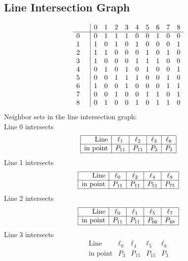 \documentclass{article}
\begin{document}
{\subsection*{Line Intersection Graph}
{\arraycolsep=1pt
$$
\begin{array}{rr|*{9}r}
 &  & 0 & 1 & 2 & 3 & 4 & 5 & 6 & 7 & 8\\
\hline
0 &  & 0 & 1 & 1 & 1 & 0 & 0 & 1 & 0 & 0\\
1 &  & 1 & 0 & 1 & 0 & 1 & 0 & 0 & 0 & 1\\
2 &  & 1 & 1 & 0 & 0 & 0 & 1 & 0 & 1 & 0\\
3 &  & 1 & 0 & 0 & 0 & 1 & 1 & 1 & 0 & 0\\
4 &  & 0 & 1 & 0 & 1 & 0 & 1 & 0 & 0 & 1\\
5 &  & 0 & 0 & 1 & 1 & 1 & 0 & 0 & 1 & 0\\
6 &  & 1 & 0 & 0 & 1 & 0 & 0 & 0 & 1 & 1\\
7 &  & 0 & 0 & 1 & 0 & 0 & 1 & 1 & 0 & 1\\
8 &  & 0 & 1 & 0 & 0 & 1 & 0 & 1 & 1 & 0\\
\end{array}
$$
}%
Neighbor sets in the line intersection graph:\\
Line 0 intersects 
$$
\begin{array}{|r*{4}{|c}|}
\hline
\mbox{Line}  & \ell_{1} & \ell_{2} & \ell_{3} & \ell_{6}\\
\hline
\mbox{in point}  & P_{11} & P_{11} & P_{3} & P_{3}\\
\hline
\end{array}
$$
Line 1 intersects 
$$
\begin{array}{|r*{4}{|c}|}
\hline
\mbox{Line}  & \ell_{0} & \ell_{2} & \ell_{4} & \ell_{8}\\
\hline
\mbox{in point}  & P_{11} & P_{11} & P_{51} & P_{75}\\
\hline
\end{array}
$$
Line 2 intersects 
$$
\begin{array}{|r*{4}{|c}|}
\hline
\mbox{Line}  & \ell_{0} & \ell_{1} & \ell_{5} & \ell_{7}\\
\hline
\mbox{in point}  & P_{11} & P_{11} & P_{60} & P_{48}\\
\hline
\end{array}
$$
Line 3 intersects 
$$
\begin{array}{|r*{4}{|c}|}
\hline
\mbox{Line}  & \ell_{0} & \ell_{4} & \ell_{5} & \ell_{6}\\
\hline
\mbox{in point}  & P_{3} & P_{15} & P_{15} & P_{3}\\

\end{array}$$}
\end{document}
